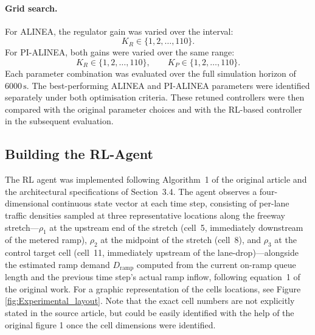 \paragraph{Grid search.}

For ALINEA, the regulator gain was varied over the interval:
\begin{equation}
    K_R \in \{1, 2, \ldots, 110\}.
\end{equation}
For PI-ALINEA, both gains were varied over the same range:
\begin{equation}
    K_R \in \{1, 2, \ldots, 110\},
    \qquad
    K_P \in \{1, 2, \ldots, 110\}.
\end{equation}
Each parameter combination was evaluated over the full simulation horizon of
$6000\,\mathrm{s}$. The best-performing ALINEA and PI-ALINEA parameters were
identified separately under both optimisation criteria. These retuned
controllers were then compared with the original parameter choices and with
the RL-based controller in the subsequent evaluation.

\subsection{Building the RL-Agent}

The RL agent was implemented following Algorithm~1 of the original article and the architectural specifications of Section~3.4. The agent observes a four-dimensional continuous state vector at each time step, consisting of per-lane traffic densities sampled at three representative locations along the freeway stretch---$\rho_1$ at the upstream end of the stretch (cell~5, immediately downstream of the metered ramp), $\rho_2$ at the midpoint of the stretch (cell~8), and $\rho_3$ at the control target cell (cell~11, immediately upstream of the lane-drop)---alongside the estimated ramp demand $D_{\mathrm{ramp}}$ computed from the current on-ramp queue length and the previous time step's actual ramp inflow, following equation~1 of the original work. For a graphic representation of the cells locations, see Figure \ref{fig:Experimental_layout}. Note that the exact cell numbers are not explicitly stated in the source article, but could be easily identified with the help of the original figure 1 once the cell dimensions were identified. 

